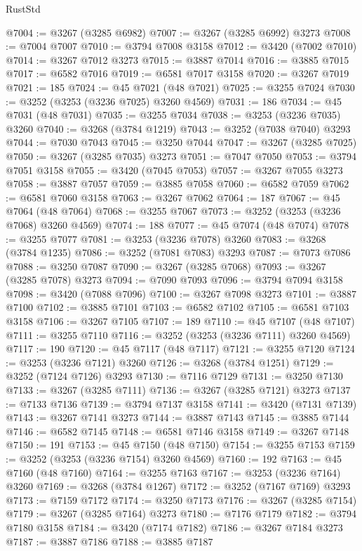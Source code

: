 \begin{lexlean}{RustStd}
\begin{coremodule}
{\begin{coremodule}
{{{{{{{{{{{{{{{{{{{{{{{{{{{{{{{{{{{{{{{@7004 := @3267 (@3285 @6982)
@7007 := @3267 (@3285 @6992) @3273
@7008 := @7004 @7007
@7010 := @3794 @7008 @3158
@7012 := @3420 (@7002 @7010)
@7014 := @3267 @7012 @3273
@7015 := @3887 @7014
@7016 := @3885 @7015
@7017 := @6582 @7016
@7019 := @6581 @7017 @3158
@7020 := @3267 @7019
@7021 := 185
@7024 := @45 @7021 (@48 @7021)
@7025 := @3255 @7024
@7030 := @3252 (@3253 (@3236 @7025) @3260 @4569)
@7031 := 186
@7034 := @45 @7031 (@48 @7031)
@7035 := @3255 @7034
@7038 := @3253 (@3236 @7035) @3260
@7040 := @3268 (@3784 @1219)
@7043 := @3252 (@7038 @7040) @3293
@7044 := @7030 @7043
@7045 := @3250 @7044
@7047 := @3267 (@3285 @7025)
@7050 := @3267 (@3285 @7035) @3273
@7051 := @7047 @7050
@7053 := @3794 @7051 @3158
@7055 := @3420 (@7045 @7053)
@7057 := @3267 @7055 @3273
@7058 := @3887 @7057
@7059 := @3885 @7058
@7060 := @6582 @7059
@7062 := @6581 @7060 @3158
@7063 := @3267 @7062
@7064 := 187
@7067 := @45 @7064 (@48 @7064)
@7068 := @3255 @7067
@7073 := @3252 (@3253 (@3236 @7068) @3260 @4569)
@7074 := 188
@7077 := @45 @7074 (@48 @7074)
@7078 := @3255 @7077
@7081 := @3253 (@3236 @7078) @3260
@7083 := @3268 (@3784 @1235)
@7086 := @3252 (@7081 @7083) @3293
@7087 := @7073 @7086
@7088 := @3250 @7087
@7090 := @3267 (@3285 @7068)
@7093 := @3267 (@3285 @7078) @3273
@7094 := @7090 @7093
@7096 := @3794 @7094 @3158
@7098 := @3420 (@7088 @7096)
@7100 := @3267 @7098 @3273
@7101 := @3887 @7100
@7102 := @3885 @7101
@7103 := @6582 @7102
@7105 := @6581 @7103 @3158
@7106 := @3267 @7105
@7107 := 189
@7110 := @45 @7107 (@48 @7107)
@7111 := @3255 @7110
@7116 := @3252 (@3253 (@3236 @7111) @3260 @4569)
@7117 := 190
@7120 := @45 @7117 (@48 @7117)
@7121 := @3255 @7120
@7124 := @3253 (@3236 @7121) @3260
@7126 := @3268 (@3784 @1251)
@7129 := @3252 (@7124 @7126) @3293
@7130 := @7116 @7129
@7131 := @3250 @7130
@7133 := @3267 (@3285 @7111)
@7136 := @3267 (@3285 @7121) @3273
@7137 := @7133 @7136
@7139 := @3794 @7137 @3158
@7141 := @3420 (@7131 @7139)
@7143 := @3267 @7141 @3273
@7144 := @3887 @7143
@7145 := @3885 @7144
@7146 := @6582 @7145
@7148 := @6581 @7146 @3158
@7149 := @3267 @7148
@7150 := 191
@7153 := @45 @7150 (@48 @7150)
@7154 := @3255 @7153
@7159 := @3252 (@3253 (@3236 @7154) @3260 @4569)
@7160 := 192
@7163 := @45 @7160 (@48 @7160)
@7164 := @3255 @7163
@7167 := @3253 (@3236 @7164) @3260
@7169 := @3268 (@3784 @1267)
@7172 := @3252 (@7167 @7169) @3293
@7173 := @7159 @7172
@7174 := @3250 @7173
@7176 := @3267 (@3285 @7154)
@7179 := @3267 (@3285 @7164) @3273
@7180 := @7176 @7179
@7182 := @3794 @7180 @3158
@7184 := @3420 (@7174 @7182)
@7186 := @3267 @7184 @3273
@7187 := @3887 @7186
@7188 := @3885 @7187
}}}}}}}}}}}}}}}}}}}}}}}}}}}}}}}}}}}}}}}
\end{coremodule}}
\end{coremodule}
\end{lexlean}
